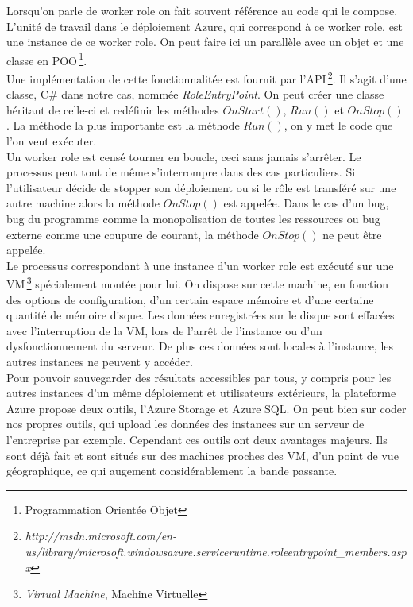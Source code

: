 Lorsqu'on parle de worker role on fait souvent référence au code qui
le compose. L'unité de travail dans le déploiement Azure, qui
correspond à ce worker role, est une instance de ce worker role.  On
peut faire ici un parallèle avec un objet et une classe en
POO\,\footnote{Programmation Orientée Objet}.\\


Une implémentation de cette fonctionnalitée est fournit par
l'API\,\footnote{\textit{http://msdn.microsoft.com/en-us/library/microsoft.windowsazure.serviceruntime.roleentrypoint\_members.aspx}}. Il
s'agit d'une classe, C\# dans notre cas, nommée
\textit{RoleEntryPoint}. On peut créer une classe héritant de celle-ci
et redéfinir les méthodes $OnStart()$, $Run()$ et $OnStop()$. La
méthode la plus importante est la méthode $Run()$, on y met le code
que l'on veut exécuter.\\

Un worker role est censé tourner en boucle, ceci sans jamais
s'arrêter. Le processus peut tout de même s'interrompre dans des cas
particuliers. Si l'utilisateur décide de stopper son déploiement ou si
le rôle est transféré sur une autre machine alors la méthode
$OnStop()$ est appelée. Dans le cas d'un bug, bug du programme comme
la monopolisation de toutes les ressources ou bug externe comme une
coupure de courant, la méthode $OnStop()$ ne peut être appelée.\\

Le processus correspondant à une instance d'un worker role est exécuté
sur une VM\,\footnote{\textit{Virtual Machine}, Machine Virtuelle}
spécialement montée pour lui. On dispose sur cette machine, en
fonction des options de configuration, d'un certain espace mémoire et
d'une certaine quantité de mémoire disque. Les données enregistrées
sur le disque sont effacées avec l'interruption de la VM, lors de
l'arrêt de l'instance ou d'un dysfonctionnement du serveur. De plus
ces données sont locales à l'instance, les autres instances ne peuvent y
accéder.\\



Pour pouvoir sauvegarder des résultats accessibles par tous, y compris
pour les autres instances d'un même déploiement et utilisateurs
extérieurs, la plateforme Azure propose deux outils, l'Azure Storage
et Azure SQL.  On peut bien sur coder nos propres outils, qui upload
les données des instances sur un serveur de l'entreprise par
exemple. Cependant ces outils ont deux avantages majeurs. Ils sont
déjà fait et sont situés sur des machines proches des VM, d'un point
de vue géographique, ce qui augement considérablement la bande
passante.\\


